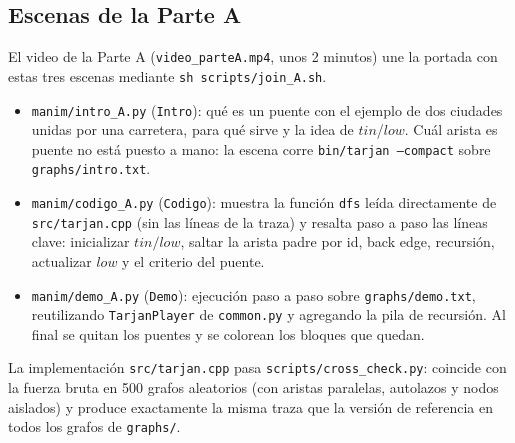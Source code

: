 \subsection{Escenas de la Parte A}
El video de la Parte A (\texttt{video\_parteA.mp4}, unos 2 minutos) une la portada con estas tres escenas
mediante \texttt{sh scripts/join\_A.sh}.
\begin{itemize}
  \item \texttt{manim/intro\_A.py} (\texttt{Intro}): qué es un puente con el ejemplo de dos ciudades
        unidas por una carretera, para qué sirve y la idea de $\mathit{tin}$/$\mathit{low}$. Cuál arista
        es puente no está puesto a mano: la escena corre \texttt{bin/tarjan --compact} sobre
        \texttt{graphs/intro.txt}.
  \item \texttt{manim/codigo\_A.py} (\texttt{Codigo}): muestra la función \texttt{dfs} leída directamente de
        \texttt{src/tarjan.cpp} (sin las líneas de la traza) y resalta paso a paso las líneas clave: inicializar
        $\mathit{tin}/\mathit{low}$, saltar la arista padre por id, back edge, recursión, actualizar $\mathit{low}$
        y el criterio del puente.
  \item \texttt{manim/demo\_A.py} (\texttt{Demo}): ejecución paso a paso sobre \texttt{graphs/demo.txt},
        reutilizando \texttt{TarjanPlayer} de \texttt{common.py} y agregando la pila de recursión.
        Al final se quitan los puentes y se colorean los bloques que quedan.
\end{itemize}
La implementación \texttt{src/tarjan.cpp} pasa \texttt{scripts/cross\_check.py}: coincide con la fuerza
bruta en 500 grafos aleatorios (con aristas paralelas, autolazos y nodos aislados) y produce exactamente
la misma traza que la versión de referencia en todos los grafos de \texttt{graphs/}.
